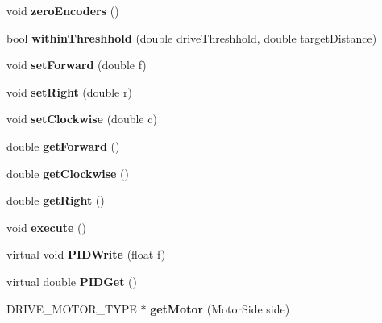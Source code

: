 \begin{DoxyCompactItemize}
\item 
\hypertarget{class_drive_bae_a332eee2604b94a0a79af935242d7e260}{}void {\bfseries zero\+Encoders} ()\label{class_drive_bae_a332eee2604b94a0a79af935242d7e260}

\item 
\hypertarget{class_drive_bae_a547909d641c7a890c427b154f982322d}{}bool {\bfseries within\+Threshhold} (double drive\+Threshhold, double target\+Distance)\label{class_drive_bae_a547909d641c7a890c427b154f982322d}

\item 
\hypertarget{class_drive_bae_ab09e8a797848efa2a1f2eb6844941cb3}{}void {\bfseries set\+Forward} (double f)\label{class_drive_bae_ab09e8a797848efa2a1f2eb6844941cb3}

\item 
\hypertarget{class_drive_bae_a4fcdfa68a38e020a0497f6256989fe0b}{}void {\bfseries set\+Right} (double r)\label{class_drive_bae_a4fcdfa68a38e020a0497f6256989fe0b}

\item 
\hypertarget{class_drive_bae_a088352135fb6a558c93c0c9da74e37e2}{}void {\bfseries set\+Clockwise} (double c)\label{class_drive_bae_a088352135fb6a558c93c0c9da74e37e2}

\item 
\hypertarget{class_drive_bae_a361b5a623c8e04643a5545daa795876b}{}double {\bfseries get\+Forward} ()\label{class_drive_bae_a361b5a623c8e04643a5545daa795876b}

\item 
\hypertarget{class_drive_bae_ac7fac12731fced5d6e9a7289fb9be485}{}double {\bfseries get\+Clockwise} ()\label{class_drive_bae_ac7fac12731fced5d6e9a7289fb9be485}

\item 
\hypertarget{class_drive_bae_a8b51a78cedeb43380363361e490fa5b5}{}double {\bfseries get\+Right} ()\label{class_drive_bae_a8b51a78cedeb43380363361e490fa5b5}

\item 
\hypertarget{class_drive_bae_aa64c38e02e64ee7795f4ae06bab26d48}{}void {\bfseries execute} ()\label{class_drive_bae_aa64c38e02e64ee7795f4ae06bab26d48}

\item 
\hypertarget{class_drive_bae_aec401bb78b3961da28c0fb36b2308ca4}{}virtual void {\bfseries P\+I\+D\+Write} (float f)\label{class_drive_bae_aec401bb78b3961da28c0fb36b2308ca4}

\item 
\hypertarget{class_drive_bae_ac4a719afe5c71f716c8753392ae0c6fd}{}virtual double {\bfseries P\+I\+D\+Get} ()\label{class_drive_bae_ac4a719afe5c71f716c8753392ae0c6fd}

\item 
\hypertarget{class_drive_bae_a06177effa3aedbcf3874701a93f36f9c}{}D\+R\+I\+V\+E\+\_\+\+M\+O\+T\+O\+R\+\_\+\+T\+Y\+P\+E $\ast$ {\bfseries get\+Motor} (Motor\+Side side)\label{class_drive_bae_a06177effa3aedbcf3874701a93f36f9c}

\end{DoxyCompactItemize}


